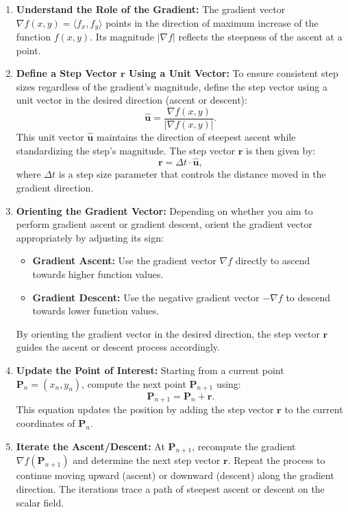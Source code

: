 \begin{enumerate}
    \item \textbf{Understand the Role of the Gradient:}
    The gradient vector \( \nabla f(x, y) = \langle f_x,f_y \rangle \) points in the direction of maximum increase of the function \( f(x, y) \). Its magnitude \( |\nabla f| \) reflects the steepness of the ascent at a point.

    \item \textbf{Define a Step Vector \( \mathbf{r} \) Using a Unit Vector:}
    To ensure consistent step sizes regardless of the gradient's magnitude, define the step vector using a unit vector in the desired direction (ascent or descent):
    \[
    \hat{\mathbf{u}} = \frac{\nabla f(x, y)}{|\nabla f(x, y)|}.
    \]
    This unit vector \( \hat{\mathbf{u}} \) maintains the direction of steepest ascent while standardizing the step's magnitude. The step vector \( \mathbf{r} \) is then given by:
    \[
    \mathbf{r} = \Delta t \cdot \hat{\mathbf{u}},
    \]
    where \( \Delta t \) is a step size parameter that controls the distance moved in the gradient direction.

    \item \textbf{Orienting the Gradient Vector:}
    Depending on whether you aim to perform gradient ascent or gradient descent, orient the gradient vector appropriately by adjusting its sign:
    \begin{itemize}
        \item \textbf{Gradient Ascent:} Use the gradient vector \( \nabla f \) directly to ascend towards higher function values.
        \item \textbf{Gradient Descent:} Use the negative gradient vector \( -\nabla f \) to descend towards lower function values.
    \end{itemize}
    By orienting the gradient vector in the desired direction, the step vector \( \mathbf{r} \) guides the ascent or descent process accordingly.

    \item \textbf{Update the Point of Interest:}
    Starting from a current point \( \mathbf{P}_n = (x_n, y_n) \), compute the next point \( \mathbf{P}_{n+1} \) using:
    \[
    \mathbf{P}_{n+1} = \mathbf{P}_n + \mathbf{r}.
    \]
    This equation updates the position by adding the step vector \( \mathbf{r} \) to the current coordinates of \( \mathbf{P}_n \).

    \item \textbf{Iterate the Ascent/Descent:}
    At \( \mathbf{P}_{n+1} \), recompute the gradient \( \nabla f(\mathbf{P}_{n+1}) \) and determine the next step vector \( \mathbf{r} \). Repeat the process to continue moving upward (ascent) or downward (descent) along the gradient direction. The iterations trace a path of steepest ascent or descent on the scalar field.


\end{enumerate}
